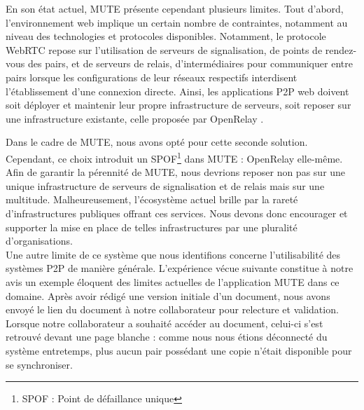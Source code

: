 En son état actuel, \ac{MUTE} présente cependant plusieurs limites.
Tout d'abord, l'environnement web implique un certain nombre de contraintes, notamment au niveau des technologies et protocoles disponibles.
Notamment, le protocole \acf{WebRTC} repose sur l'utilisation de serveurs de signalisation, \ie de points de rendez-vous des pairs, et de serveurs de relais, \ie d'intermédiaires pour communiquer entre pairs lorsque les configurations de leur réseaux respectifs interdisent l'établissement d'une connexion directe.
Ainsi, les applications \ac{P2P} web doivent soit déployer et maintenir leur propre infrastructure de serveurs, soit reposer sur une infrastructure existante, \eg celle proposée par OpenRelay \cite{openrelay}.

Dans le cadre de \ac{MUTE}, nous avons opté pour cette seconde solution.
Cependant, ce choix introduit un \acf{SPOF}\footnote{\acf{SPOF} : Point de défaillance unique} dans \ac{MUTE} : OpenRelay elle-même.
Afin de garantir la pérennité de \ac{MUTE}, nous devrions reposer non pas sur une unique infrastructure de serveurs de signalisation et de relais mais sur une multitude.
Malheureusement, l'écosystème actuel brille par la rareté d'infrastructures publiques offrant ces services.
Nous devons donc encourager et supporter la mise en place de telles infrastructures par une pluralité d'organisations.\\

Une autre limite de ce système que nous identifions concerne l'utilisabilité des systèmes \ac{P2P} de manière générale.
L'expérience vécue suivante constitue à notre avis un exemple éloquent des limites actuelles de l'application \ac{MUTE} dans ce domaine.
Après avoir rédigé une version initiale d'un document, nous avons envoyé le lien du document à notre collaborateur pour relecture et validation.
Lorsque notre collaborateur a souhaité accéder au document, celui-ci s'est retrouvé devant une page blanche : comme nous nous étions déconnecté du système entretemps, plus aucun pair possédant une copie n'était disponible pour se synchroniser.

